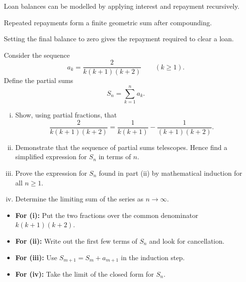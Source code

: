 \begin{takeaways}
\item Loan balances can be modelled by applying interest and repayment recursively.
\item Repeated repayments form a finite geometric sum after compounding.
\item Setting the final balance to zero gives the repayment required to clear a loan.
\end{takeaways}

\newpage
\begin{problem}
Consider the sequence
\[
a_k=\frac{2}{k(k+1)(k+2)}\qquad (k\ge 1).
\]
Define the partial sums
\[
S_n=\sum_{k=1}^n a_k.
\]

\begin{enumerate}[(i)]
\item Show, using partial fractions, that
\[
\frac{2}{k(k+1)(k+2)}
=\frac{1}{k(k+1)}-\frac{1}{(k+1)(k+2)}.
\]
\item Demonstrate that the sequence of partial sums telescopes. Hence find a simplified expression for $S_n$ in terms of $n$.
\item Prove the expression for $S_n$ found in part (ii) by mathematical induction for all $n\ge 1$.
\item Determine the limiting sum of the series as $n\to\infty$.
\end{enumerate}
\end{problem}
\begin{hint}
\begin{itemize}
\item \textbf{For (i):} Put the two fractions over the common denominator $k(k+1)(k+2)$.
\item \textbf{For (ii):} Write out the first few terms of $S_n$ and look for cancellation.
\item \textbf{For (iii):} Use $S_{m+1}=S_m+a_{m+1}$ in the induction step.
\item \textbf{For (iv):} Take the limit of the closed form for $S_n$.
\end{itemize}
\end{hint}
